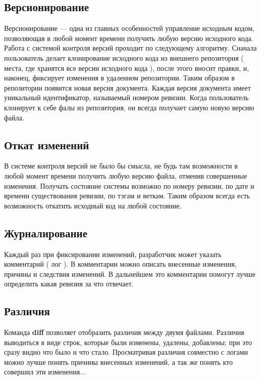 \subsection{ Версионирование } \label{sect3_2_2}

Версионирование --- одна из главных особенностей управление исходным кодом, позволяющая в любой момент времени получить любую версию исходного кода. Работа с системой контроля версий  проходит по следующему алгоритму. Сначала пользователь делает клонирование исходного кода из внешнего репозитория ( места, где хранятся все версии исходного кода ), после этого вносит правки, и, наконец, фиксирует изменения в удаленном репозитории. Таким образом в репозитории появится новая версия документа. Каждая версия документа имеет уникальный идентификатор, называемый номером ревизии. Когда пользователь клонирует к себе фалы из репозитория, он всегда получает самую новую версию файла.


\subsection{ Откат изменений } \label{sect3_2_3}

В системе контроля версий не было бы смысла, не будь там возможности в любой момент времени получить любую версию файла, отменив совершенные изменения. Получать состояние системы возможно по номеру ревизии, по дате и времени существования ревизии, по тэгам и веткам. Таким образом всегда есть возможность откатить исходный код на любой состояние.

\subsection{ Журналирование } \label{sect3_2_4}

Каждый раз при фиксировании изменений, разработчик может указать комментарий ( лог ). В комментарии можно описать внесенные изменения, причины и следствия изменений. В дальнейшем это комментарии помогут лучше определить какая ревизия за что отвечает.

\subsection{ Различия } \label{sect3_2_5}

Команда \textbf{diff} позволяет отобразить различия между двумя файлами. Различия выводиться в виде строк, которые были изменены, удалены, добавлены; при это сразу видно что было и что стало. Просматривая различия совместно с логами можно лучше понять причины внесенных изменений, а так же понять кто совершил эти изменения...

